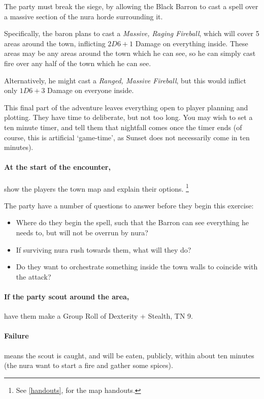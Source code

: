\begin{multicols}{2}

\noindent
The party must break the siege, by allowing the Black Barron to cast a spell over a massive section of the nura horde surrounding it.

Specifically, the baron plans to cast a \textit{Massive, Raging Fireball}, which will cover 5 areas around the town, inflicting $2D6+1$ Damage on everything inside.
These areas may be any areas around the town which he can see, so he can simply cast fire over any half of the town which he can see.

Alternatively, he might cast a \textit{Ranged, Massive Fireball}, but this would inflict only $1D6 + 3$ Damage on everyone inside.

This final part of the adventure leaves everything open to player planning and plotting.
They have time to deliberate, but not too long.
You may wish to set a ten minute timer, and tell them that nightfall comes once the timer ends (of course, this is artificial `game-time', as Sunset does not necessarily come in ten minutes).

\paragraph{At the start of the encounter,}
show the players the town map and explain their options.%
\footnote{See \autoref{handouts}, for the map handouts.}

The party have a number of questions to answer before they begin this exercise:

\begin{itemize}

	\item{Where do they begin the spell, such that the Barron can see everything he needs to, but will not be overrun by nura?}
	\item{If surviving nura rush towards them, what will they do?}
	\item{Do they want to orchestrate something inside the town walls to coincide with the attack?}

\end{itemize}

\paragraph{If the party scout around the area,}
have them make a Group Roll of Dexterity + Stealth, TN 9.

		\paragraph{Failure}
		means the scout is caught, and will be eaten, publicly, within about ten minutes (the nura want to start a fire and gather some spices).


\end{multicols}
